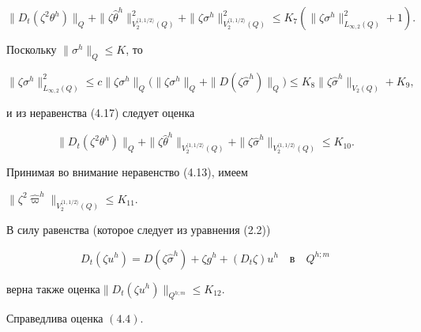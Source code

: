 \begin{pf}
\begin{equation}


\|D_t(\zeta^2\theta^h)\|_Q+


\|\zeta\widehat\theta^h\|^2_{V_2^{\langle 1,1/2\rangle}(Q)}+


\|\zeta\sigma^h\|^2_{V_2^{\langle 1,1/2\rangle}(Q)}


\le K_7(\|\zeta\sigma^h\|^2_{L_{\infty,2}(Q)}+1).


\end{equation}


Поскольку $\|\sigma^h\|_Q\le K$, то


$$


\|\zeta\sigma^h\|^2_{L_{\infty,2}(Q)}


\le c \|\zeta\sigma^h\|_Q


\big(\|\zeta\sigma^h\|_Q+


\|D(\zeta\widehat\sigma^h)\|_Q\big)\le


K_8\|{\zeta\widehat\sigma^h}\|_{V_2(Q)}+K_9,


$$


и из неравенства (4.17) следует оценка


$$


\|D_t(\zeta^2\theta^h)\|_Q+


\|\zeta\widehat\theta^h\|_{V_2^{\langle 1,1/2\rangle}(Q)}+


\|\zeta\widehat\sigma^h\|_{V_2^{\langle 1,1/2\rangle}(Q)}\le K_{10}.


$$


Принимая во внимание неравенство (4.13), имеем\quad


$\|\zeta^2\widehat\varpi^h\|_{V_2^{\langle 1,1/2\rangle}(Q)}\le K_{11}$.


В силу равенства (которое следует из уравнения (2.2))


\begin{equation}


D_t(\zeta u^h)=D(\zeta\widehat\sigma^h)+\zeta g^h+(D_t\zeta)u^h\quad


\text{в}\quad Q^{h;m}


\end{equation}


верна также оценка\quad $\|D_t(\zeta u^h)\|_{Q^{h;m}}\le K_{12}$.


\end{pf}








\begin{lems} Справедлива оценка $(4.4)$.


\end{lems}





